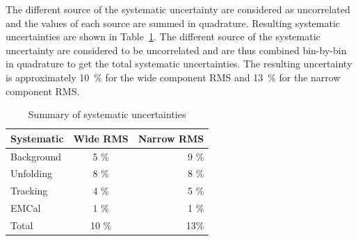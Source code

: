 The different source of the systematic uncertainty are considered as uncorrelated and the values of each source are summed in quadrature. Resulting systematic uncertainties are shown in Table~\ref{tab:systematics}. The different source of the systematic uncertainty are considered to be uncorrelated and are thus combined bin-by-bin in quadrature to get the total systematic uncertainties.  The resulting uncertainty is approximately 10~\% for the wide component RMS and 13~\% for the narrow component RMS. 

\begin{table}[htb]
\centering
\caption{Summary of systematic uncertainties}
\label{tab:systematics}
\begin{tabular}{ l | c | r }
  Systematic & Wide RMS & Narrow RMS \\
    \hline			
  Background & 5 \% & 9 \% \\
  Unfolding & 8 \% & 8 \% \\
  Tracking & 4 \% & 5 \% \\ 
  EMCal & 1 \% & 1 \% \\
  Total & 10 \% & 13\% \\
  \hline
  \end{tabular}
  \end{table}


%  
%

